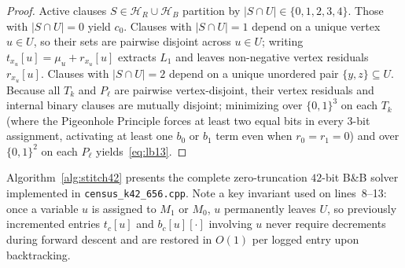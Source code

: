 \documentclass[11pt,a4paper]{article}
\theoremstyle{plain}
\theoremstyle{definition}
\begin{document}
\begin{proof}
Active clauses $S \in \mathcal{H}_R \cup \mathcal{H}_B$ partition by $|S \cap U| \in \{0,1,2,3,4\}$. Those with $|S \cap U| = 0$ yield $c_0$. Clauses with $|S \cap U| = 1$ depend on a unique vertex $u \in U$, so their sets are pairwise disjoint across $u \in U$; writing $t_{x_u}[u] = \mu_u + r_{x_u}[u]$ extracts $L_1$ and leaves non-negative vertex residuals $r_{x_u}[u]$. Clauses with $|S \cap U| = 2$ depend on a unique unordered pair $\{y,z\} \subseteq U$. Because all $T_k$ and $P_\ell$ are pairwise vertex-disjoint, their vertex residuals and internal binary clauses are mutually disjoint; minimizing over $\{0,1\}^3$ on each $T_k$ (where the Pigeonhole Principle forces at least two equal bits in every $3$-bit assignment, activating at least one $b_0$ or $b_1$ term even when $r_0 = r_1 = 0$) and over $\{0,1\}^2$ on each $P_\ell$ yields~\eqref{eq:lb13}.
\end{proof}

Algorithm~\ref{alg:stitch42} presents the complete zero-truncation $42$-bit B\&B solver implemented in \texttt{census\_\allowbreak k42\_\allowbreak 656.cpp}. Note a key invariant used on lines~8--13: once a variable $u$ is assigned to $M_1$ or $M_0$, $u$ permanently leaves $U$, so previously incremented entries $t_c[u]$ and $b_c[u][\cdot]$ involving $u$ never require decrements during forward descent and are restored in $O(1)$ per logged entry upon backtracking.
\end{document}
